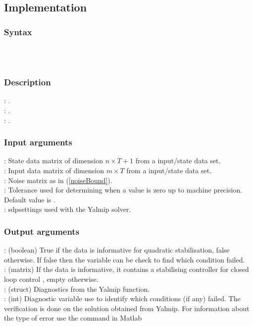 \subsection{Implementation}
\subsubsection*{Syntax}
 \\
 \\

\subsubsection*{Description} 
: . \\
: . \\
: .

\subsubsection*{Input arguments}
\textbf{}: State data matrix of dimension $n \times T+1$ from a input/state data set.\\
\textbf{}: Input data matrix of dimension $m \times T$ from a input/state data set.\\
\textbf{}: Noise matrix as in (\ref{noiseBound}). \\ 
\textbf{}: Tolerance used for determining when a value is zero up to machine precision. Default value is .\\
\textbf{}: sdpsettings used with the Yalmip solver.

\subsubsection*{Output arguments}
\textbf{}: (boolean) True if the data is informative for quadratic stabilisation, false otherwise. If false then the  variable can be check to find which condition failed. \\
\textbf{}: (matrix) If the data is informative, it contains a stabilising controller  for closed loop control , empty otherwise.\\
\textbf{}: (struct) Diagnostics from the Yalmip  function. \\
\textbf{}: (int) Diagnostic variable use to identify which conditions (if any) failed. The verification is done on the solution obtained from Yalmip. For information about the type of error use the  command in Matlab


